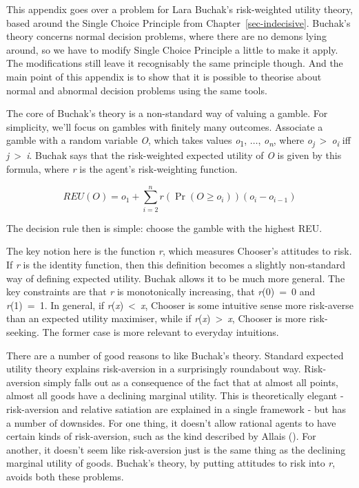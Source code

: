 \documentclass[
  12pt,
  letterpaper,
  DIV=11,
  numbers=noendperiod]{scrreprt}
\begin{document}
This appendix goes over a problem for Lara Buchak's risk-weighted
utility theory, based around the Single Choice Principle from
Chapter~\ref{sec-indecisive}. Buchak's theory concerns normal decision
problems, where there are no demons lying around, so we have to modify
Single Choice Principle a little to make it apply. The modifications
still leave it recognisably the same principle though. And the main
point of this appendix is to show that it is possible to theorise about
normal and abnormal decision problems using the same tools.

The core of Buchak's theory is a non-standard way of valuing a gamble.
For simplicity, we'll focus on gambles with finitely many outcomes.
Associate a gamble with a random variable \emph{O}, which takes values
\emph{o}\textsubscript{1}, \(\dots\), \emph{o\textsubscript{n}}, where
\emph{o\textsubscript{j}}~\textgreater~\emph{o\textsubscript{i}} iff
\emph{j}~\textgreater~\emph{i}. Buchak says that the risk-weighted
expected utility of \emph{O} is given by this formula, where \emph{r} is
the agent's risk-weighting function.

\[
REU(O) = o_1 + \sum_{i = 2}^n r(\Pr(O \geq o_i))(o_i - o_{i-1})
\]

The decision rule then is simple: choose the gamble with the highest
REU.

The key notion here is the function \emph{r}, which measures Chooser's
attitudes to risk. If \emph{r} is the identity function, then this
definition becomes a slightly non-standard way of defining expected
utility. Buchak allows it to be much more general. The key constraints
are that \emph{r} is monotonically increasing, that \emph{r}(0)~=~0 and
\emph{r}(1)~=~1. In general, if \emph{r}(\emph{x})~\textless~\emph{x},
Chooser is some intuitive sense more risk-averse than an expected
utility maximiser, while if \emph{r}(\emph{x})~\textgreater~\emph{x},
Chooser is more risk-seeking. The former case is more relevant to
everyday intuitions.

There are a number of good reasons to like Buchak's theory. Standard
expected utility theory explains risk-aversion in a surprisingly
roundabout way. Risk-aversion simply falls out as a consequence of the
fact that at almost all points, almost all goods have a declining
marginal utility. This is theoretically elegant - risk-aversion and
relative satiation are explained in a single framework - but has a
number of downsides. For one thing, it doesn't allow rational agents to
have certain kinds of risk-aversion, such as the kind described by
Allais (). For another, it doesn't seem
like risk-aversion just is the same thing as the declining marginal
utility of goods. Buchak's theory, by putting attitudes to risk into
\emph{r}, avoids both these problems.
\end{document}
